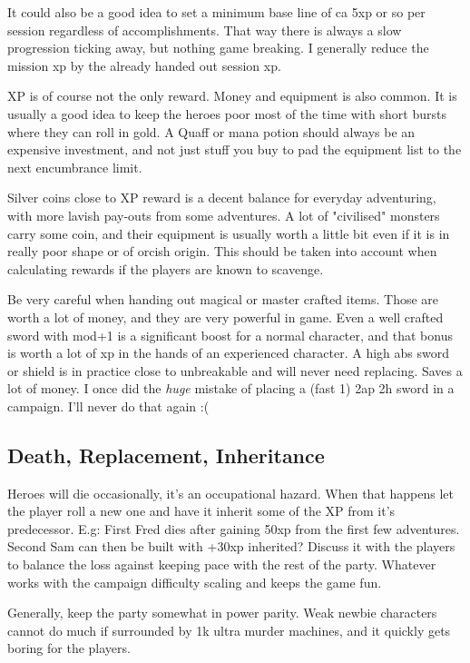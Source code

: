 It could also be a good idea to set a minimum base line of ca 5xp or so per session regardless of accomplishments. That way there is always a slow progression ticking away, but nothing game breaking. I generally reduce the mission xp by the already handed out session xp.

XP is of course not the only reward. Money and equipment is also common. It is usually a good idea to keep the heroes poor most of the time with short bursts where they can roll in gold. A Quaff or mana potion should always be an expensive investment, and not just stuff you buy to pad the equipment list to the next encumbrance limit.

Silver coins close to XP reward is a decent balance for everyday adventuring, with more lavish pay-outs from some adventures. A lot of "civilised" monsters carry some coin, and their equipment is usually worth a little bit even if it is in really poor shape or of orcish origin. This should be taken into account when calculating rewards if the players are known to scavenge.

Be very careful when handing out magical or master crafted items. Those are worth a lot of money, and they are very powerful in game. Even a well crafted sword with mod+1 is a significant boost for a normal character, and that bonus is worth a lot of xp in the hands of an experienced character. A high abs sword or shield is in practice close to unbreakable and will never need replacing. Saves a lot of money.
I once did the \emph{huge} mistake of placing a (fast 1) 2ap 2h sword in a campaign. I'll never do that again :(


\subsection*{Death, Replacement, Inheritance}
Heroes will die occasionally, it's an occupational hazard. When that happens let the player roll a new one and have it inherit some of the XP from it's predecessor. E.g: First Fred dies after gaining 50xp from the first few adventures. Second Sam can then be built with +30xp inherited? Discuss it with the players to balance the loss against keeping pace with the rest of the party. Whatever works with the campaign difficulty scaling and keeps the game fun.

Generally, keep the party somewhat in power parity. Weak newbie characters cannot do much if surrounded by 1k ultra murder machines, and it quickly gets boring for the players.


